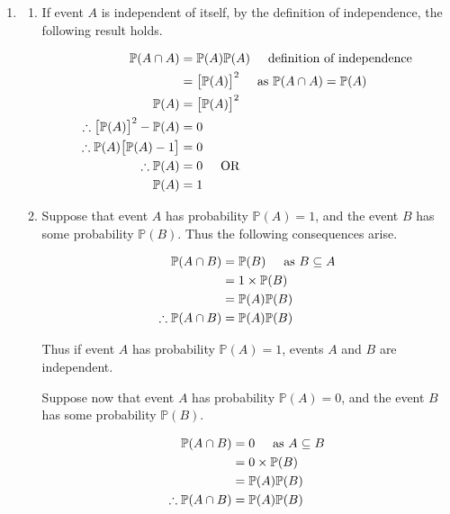 \documentclass[a4paper]{article}
\newcommand{\p}{\mathbb{P}}
\newcommand{\ds}{\displaystyle}
\begin{document}
\begin{enumerate}

	\item 
	\begin{enumerate}

		\item If event $\ds{A}$ is independent of itself, by the definition of independence, the following result holds.

		\begin{align*}
			\p(A \cap A) & = \p(A)\p(A) \hspace{5mm} \text{definition of independence} \\
			& = \big[\p(A) \big] ^2 \hspace{5mm} \text{as $\ds{\p(A \cap A) = \p(A)}$}\\
			\p(A) & = \big[\p(A) \big] ^2 \\
			\therefore \big[\p(A) \big] ^2 - \p(A) & = 0 \\
			\therefore \p(A)\big[\p(A) - 1 \big]  & = 0 \\
			\therefore \p(A) & = 0 \hspace{5mm} \text{OR} \\
			\p(A) & = 1 \\
		\end{align*}

		\item Suppose that event $\ds{A}$ has probability $\ds{\p(A) = 1}$, and the event $\ds{B}$ has some probability $\ds{\p(B)}$. Thus the following consequences arise.

		\begin{align*}
			\p(A \cap B) & = \p(B) \hspace{5mm} \text{as $B \subseteq A$}\\
			& = 1 \times \p(B) \\
			& = \p(A)\p(B) \\
			\therefore \p(A \cap B) & = \p(A)\p(B) \\
		\end{align*}

		Thus if event $\ds{A}$ has probability $\ds{\p(A) = 1}$, events $\ds{A}$ and $\ds{B}$ are independent.

		\bigbreak

		Suppose now that event $\ds{A}$ has probability $\ds{\p(A) = 0}$, and the event $\ds{B}$ has some probability $\ds{\p(B)}$.

		\begin{align*}
			\p(A \cap B) & = 0 \hspace{5mm} \text{as $A \subseteq B$}\\
			& = 0 \times \p(B) \\
			& = \p(A)\p(B) \\
			\therefore \p(A \cap B) & = \p(A)\p(B) \\
		\end{align*}


\end{enumerate}
\end{enumerate}
\end{document}
